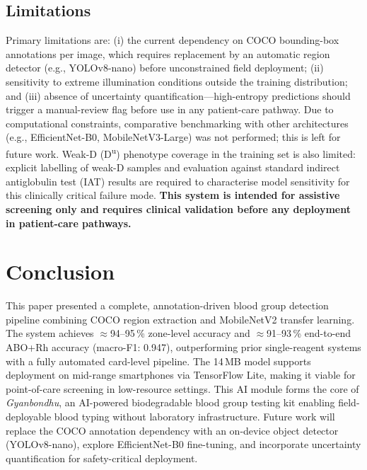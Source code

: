 \documentclass[conference]{IEEEtran}
\begin{document}
\subsection{Limitations}

Primary limitations are: (i) the current dependency on COCO
bounding-box annotations per image, which requires replacement by
an automatic region detector (e.g., YOLOv8-nano) before
unconstrained field deployment; (ii) sensitivity to extreme
illumination conditions outside the training distribution;
and (iii) absence of uncertainty quantification---high-entropy
predictions should trigger a manual-review flag before use in any
patient-care pathway.
Due to computational constraints, comparative benchmarking with
other architectures (e.g., EfficientNet-B0, MobileNetV3-Large) was
not performed; this is left for future work.
Weak-D (D\textsuperscript{u}) phenotype coverage in the training set
is also limited: explicit labelling of weak-D samples and evaluation
against standard indirect antiglobulin test (IAT) results are
required to characterise model sensitivity for this clinically
critical failure mode.
\textbf{This system is intended for assistive screening only and
requires clinical validation before any deployment in patient-care
pathways.}

\section{Conclusion}

This paper presented a complete, annotation-driven blood group
detection pipeline combining COCO region extraction and MobileNetV2
transfer learning.
The system achieves $\approx$94--95\,\% zone-level accuracy and
$\approx$91--93\,\% end-to-end ABO+Rh accuracy (macro-F1: 0.947),
outperforming prior single-reagent systems with a fully automated
card-level pipeline.
The 14\,MB model supports deployment on mid-range smartphones via
TensorFlow Lite, making it viable for point-of-care screening in
low-resource settings.
This AI module forms the core of \emph{Gyanbondhu}, an AI-powered
biodegradable blood group testing kit enabling field-deployable
blood typing without laboratory infrastructure.
Future work will replace the COCO annotation dependency with an
on-device object detector (YOLOv8-nano), explore EfficientNet-B0
fine-tuning, and incorporate uncertainty quantification for
safety-critical deployment.
\end{document}
